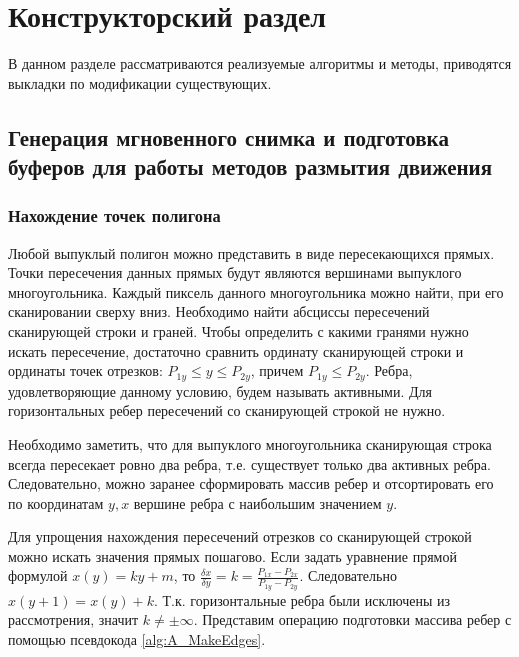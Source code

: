 \chapter{Конструкторский раздел}
\label{cha:design}

В данном разделе рассматриваются реализуемые алгоритмы и методы, приводятся выкладки по модификации существующих.

\section{Генерация мгновенного снимка и подготовка буферов для работы методов размытия движения}

\subsection{Нахождение точек полигона}

Любой выпуклый полигон можно представить в виде пересекающихся прямых. Точки пересечения данных прямых будут являются вершинами выпуклого многоугольника. Каждый пиксель данного многоугольника можно найти, при его сканировании сверху вниз. Необходимо найти абсциссы пересечений сканирующей строки и граней. Чтобы определить с какими гранями нужно искать пересечение, достаточно сравнить ординату сканирующей строки и ординаты точек отрезков: $P_{1y} \leq y \leq P_{2y}$, причем $P_{1y} \leq P_{2y}$. Ребра, удовлетворяющие данному условию, будем называть активными. Для горизонтальных ребер пересечений со сканирующей строкой не нужно.

Необходимо заметить, что для выпуклого многоугольника сканирующая строка всегда пересекает ровно два ребра, т.е. существует только два активных ребра. Следовательно, можно заранее сформировать массив ребер и отсортировать его по координатам $y,x$ вершине ребра с наибольшим значением $y$. 

Для упрощения нахождения пересечений отрезков со сканирующей строкой можно искать значения прямых пошагово. Если задать уравнение прямой формулой $x(y) = ky + m$, то $\frac{\delta x}{\delta y} = k = \frac{P_{1x} - P_{2x}}{P_{1y} - P_{2y}}$. Следовательно $x(y + 1) = x(y) + k$. Т.к. горизонтальные ребра были исключены из рассмотрения, значит $k \neq \pm \infty$. Представим операцию подготовки массива ребер с помощью псевдокода \ref{alg:A_MakeEdges}.

